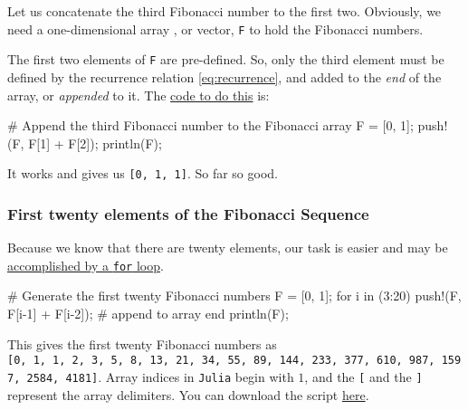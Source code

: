 \documentclass[
  a4paper,
]{article}
\newenvironment{Shaded}{\begin{snugshade}}{\end{snugshade}}
\newcommand{\CommentTok}[1]{\textcolor[rgb]{0.50,0.62,0.50}{#1}}
\newcommand{\ControlFlowTok}[1]{\textcolor[rgb]{0.94,0.87,0.69}{#1}}
\newcommand{\FloatTok}[1]{\textcolor[rgb]{0.75,0.75,0.82}{#1}}
\newcommand{\FunctionTok}[1]{\textcolor[rgb]{0.94,0.94,0.56}{#1}}
\newcommand{\KeywordTok}[1]{\textcolor[rgb]{0.94,0.87,0.69}{#1}}
\newcommand{\NormalTok}[1]{\textcolor[rgb]{0.80,0.80,0.80}{#1}}
\newcommand{\OperatorTok}[1]{\textcolor[rgb]{0.94,0.94,0.82}{#1}}
\begin{document}
Let us concatenate the third Fibonacci number to the first two.
Obviously, we need a one-dimensional array , or vector, \texttt{F} to
hold the Fibonacci numbers.

The first two elements of \texttt{F} are pre-defined. So, only the third
element must be defined by the recurrence relation \cref{eq:recurrence},
and added to the \emph{end} of the array, or \emph{appended} to it. The
\href{first-three.jl}{code to do this} is:

\begin{Shaded}
\begin{Highlighting}[]
\CommentTok{\# Append the third Fibonacci number to the Fibonacci array}
\NormalTok{F }\OperatorTok{=}\NormalTok{ [}\FloatTok{0}\NormalTok{, }\FloatTok{1}\NormalTok{];}
\FunctionTok{push!}\NormalTok{(F, F[}\FloatTok{1}\NormalTok{] }\OperatorTok{+}\NormalTok{ F[}\FloatTok{2}\NormalTok{]);}
\FunctionTok{println}\NormalTok{(F);}
\end{Highlighting}
\end{Shaded}

It works and gives us \texttt{{[}0,\ 1,\ 1{]}}. So far so good.

\hypertarget{first-twenty-elements-of-the-fibonacci-sequence}{%
\subsubsection{First twenty elements of the Fibonacci
Sequence}\label{first-twenty-elements-of-the-fibonacci-sequence}}

Because we know that there are twenty elements, our task is easier and
may be \href{auxiliary/first-twenty.jl}{accomplished by a \texttt{for}
loop}.

\begin{Shaded}
\begin{Highlighting}[]
\CommentTok{\# Generate the first twenty Fibonacci numbers}
\NormalTok{F }\OperatorTok{=}\NormalTok{ [}\FloatTok{0}\NormalTok{, }\FloatTok{1}\NormalTok{];}
\ControlFlowTok{for}\NormalTok{ i }\KeywordTok{in}\NormalTok{ (}\FloatTok{3}\OperatorTok{:}\FloatTok{20}\NormalTok{)}
  \FunctionTok{push!}\NormalTok{(F, F[i}\OperatorTok{{-}}\FloatTok{1}\NormalTok{] }\OperatorTok{+}\NormalTok{ F[i}\OperatorTok{{-}}\FloatTok{2}\NormalTok{]); }\CommentTok{\# append to array}
\ControlFlowTok{end}
\FunctionTok{println}\NormalTok{(F);}
\end{Highlighting}
\end{Shaded}

This gives the first twenty Fibonacci numbers as
\texttt{{[}0,\ 1,\ 1,\ 2,\ 3,\ 5,\ 8,\ 13,\ 21,\ 34,\ 55,\ 89,\ 144,\ 233,\ 377,\ 610,\ 987,\ 1597,\ 2584,\ 4181{]}}.
Array indices in \texttt{Julia} begin with \(1\), and the \texttt{{[}}
and the \texttt{{]}} represent the array delimiters. You can download
the script \href{auxiliary/\%7Dfirst-twenty.jl}{here}.
\end{document}
